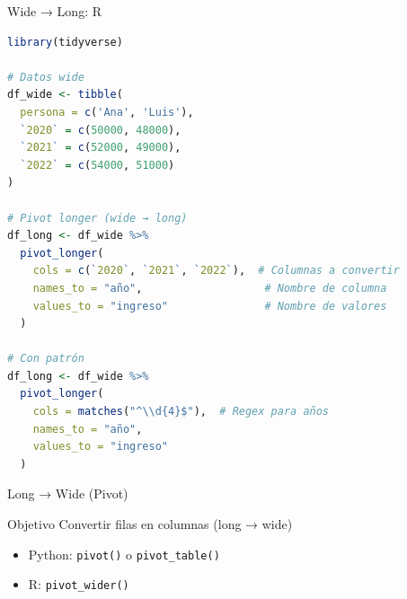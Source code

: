 \documentclass[aspectratio=169]{beamer}
\begin{document}
\begin{frame}[fragile]{Wide → Long: R}
\begin{lstlisting}[language=R]
library(tidyverse)

# Datos wide
df_wide <- tibble(
  persona = c('Ana', 'Luis'),
  `2020` = c(50000, 48000),
  `2021` = c(52000, 49000),
  `2022` = c(54000, 51000)
)

# Pivot longer (wide → long)
df_long <- df_wide %>%
  pivot_longer(
    cols = c(`2020`, `2021`, `2022`),  # Columnas a convertir
    names_to = "año",                   # Nombre de columna
    values_to = "ingreso"               # Nombre de valores
  )

# Con patrón
df_long <- df_wide %>%
  pivot_longer(
    cols = matches("^\\d{4}$"),  # Regex para años
    names_to = "año",
    values_to = "ingreso"
  )
\end{lstlisting}
\end{frame}

\begin{frame}{Long → Wide (Pivot)}
\begin{block}{Objetivo}
Convertir filas en columnas (long → wide)
\end{block}

\begin{center}
\end{center}

\vspace{0.5em}

\begin{itemize}
    \item Python: \texttt{pivot()} o \texttt{pivot\_table()}
    \item R: \texttt{pivot\_wider()}
\end{itemize}
\end{frame}
\end{document}
